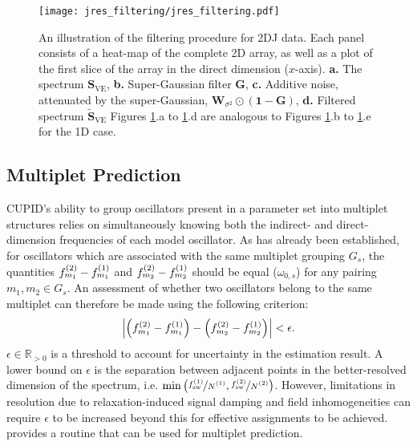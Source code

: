 \begin{figure}
    \centering
    \texttt{[image: jres\_filtering/jres\_filtering.pdf]}
    \caption[
        An illustration of the filtering procedure for \acs{2DJ} data.
    ]
    {
        An illustration of the filtering procedure for \ac{2DJ} data.
        Each panel consists of a heat-map of the complete \ac{2D} array, as well as
        a plot of the first slice of the array in the direct dimension ($x$-axis).
        \textbf{a.} The spectrum $\symbf{S}_{\text{VE}}$,
        \textbf{b.} Super-Gaussian filter $\symbf{G}$,
        \textbf{c.} Additive noise, attenuated by the super-Gaussian, $\symbf{W}_{\sigma^2} \odot (\symbf{1} - \symbf{G})$,
        \textbf{d.} Filtered spectrum $\widetilde{\symbf{S}}_{\text{VE}}$
        Figures \ref{fig:jres-filtering}.a to \ref{fig:jres-filtering}.d
        are analogous to
        Figures \ref{fig:jres-filtering}.b to \ref{fig:jres-filtering}.e
        for the \ac{1D} case.
    }
    \label{fig:jres-filtering}
\end{figure}


\subsection{Multiplet Prediction}
\label{subsec:mp-selection}
\ac{CUPID}'s ability to group oscillators present in a parameter set into
multiplet structures relies on simultaneously knowing both the indirect- and
direct-dimension frequencies of each model oscillator. As has already been
established, for oscillators which are associated with the same multiplet
grouping $G_s$, the quantities $f^{(2)}_{m_1} - f^{(1)}_{m_1}$ and $f^{(2)}_{m_2} -
f^{(1)}_{m_2}$ should be equal ($\omega_{0,s}$) for any pairing  $m_1, m_2 \in
G_s$. An assessment of whether two oscillators belong to the same multiplet can
therefore be made using the following criterion:
\begin{equation}
    \left \lvert
        \left( f^{(2)}_{m_1} - f^{(1)}_{m_1} \right) -
        \left( f^{(2)}_{m_2} - f^{(1)}_{m_2} \right)
    \right \rvert < \epsilon.
\end{equation}
$\epsilon \in \mathbb{R}_{>0}$ is a threshold to account for uncertainty in
the estimation result. A lower bound on $\epsilon$ is the separation between
adjacent points in the better-resolved dimension of the spectrum, i.e.
$\min\left(\nicefrac{\fswone}{\None},
\nicefrac{\fswtwo}{\Ntwo}\right)$.  However, limitations in resolution due to
relaxation-induced signal damping and field inhomogeneities can require
$\epsilon$ to be increased beyond this for effective assignments
to be achieved.  provides a \Python routine that
can be used for multiplet prediction.

